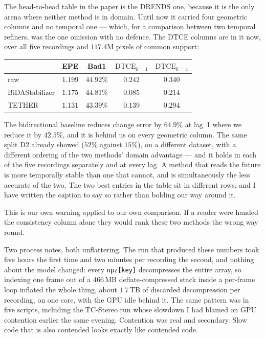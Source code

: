 \documentclass[11pt,a4paper]{article}
\begin{document}
The head-to-head table in the paper is the DRENDS one, because it is the only arena
where neither method is in domain. Until now it carried four geometric columns and
no temporal one --- which, for a comparison between two temporal refiners, was the
one omission with no defence. The DTCE columns are in it now, over all five
recordings and $117.4$M pixels of common support:

\begin{center}
\begin{tabular}{lcccc}
\toprule
& EPE & Bad1 & $\mathrm{DTCE}_{k=1}$ & $\mathrm{DTCE}_{k=4}$ \\
\midrule
raw            & $1.199$ & $44.92\%$ & $0.242$ & $0.340$ \\
BiDAStabilizer & $1.175$ & $44.81\%$ & $0.085$ & $0.214$ \\
TETHER         & $1.131$ & $43.39\%$ & $0.139$ & $0.294$ \\
\bottomrule
\end{tabular}
\end{center}

The bidirectional baseline reduces change error by $64.9\%$ at lag~1 where we reduce
it by $42.5\%$, and it is behind us on every geometric column. The same split D2
already showed ($52\%$ against $15\%$), on a different dataset, with a different
ordering of the two methods' domain advantage --- and it holds in each of the five
recordings separately and at every lag. A method that reads the future is more
temporally stable than one that cannot, and is simultaneously the less accurate of
the two. The two best entries in the table sit in different rows, and I have written
the caption to say so rather than bolding our way around it.

This is our own warning applied to our own comparison. If a reader were handed the
consistency column alone they would rank these two methods the wrong way round.

Two process notes, both unflattering. The run that produced these numbers took five
hours the first time and two minutes per recording the second, and nothing about the
model changed: every \texttt{npz[key]} decompresses the entire array, so indexing
one frame out of a $466$\,MB deflate-compressed stack inside a per-frame loop
inflated the whole thing, about $1.7$\,TB of discarded decompression per recording,
on one core, with the GPU idle behind it. The same pattern was in five scripts,
including the TC-Stereo run whose slowdown I had blamed on GPU contention earlier
the same evening. Contention was real and secondary. Slow code that is also
contended looks exactly like contended code.
\end{document}
